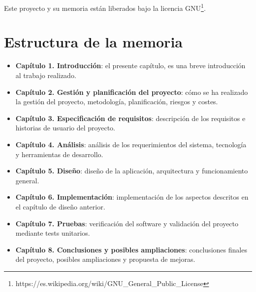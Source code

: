 Este proyecto y su memoria están liberados bajo la licencia GNU\footnote{https://es.wikipedia.org/wiki/GNU\_General\_Public\_License}.

\section{Estructura de la memoria}

\begin{itemize}
    \item \textbf{Capítulo 1. Introducción}: el presente capítulo, es una breve introducción al trabajo realizado. 
    \item \textbf{Capítulo 2. Gestión y planificación del proyecto}: cómo se ha realizado la gestión del proyecto, metodología, planificación, riesgos y costes.
    \item \textbf{Capítulo 3. Especificación de requisitos}: descripción de los requisitos e historias de usuario del proyecto.
    \item \textbf{Capítulo 4. Análisis}: análisis de los requerimientos del sistema, tecnología y herramientas de desarrollo.
    \item \textbf{Capítulo 5. Diseño}: diseño de la aplicación, arquitectura y funcionamiento general.
    \item \textbf{Capítulo 6. Implementación}: implementación de los aspectos descritos en el capítulo de diseño anterior.
    \item \textbf{Capítulo 7. Pruebas}: verificación del software y validación del proyecto mediante tests unitarios.
    \item \textbf{Capítulo 8. Conclusiones y posibles ampliaciones}: conclusiones finales del proyecto, posibles ampliaciones y propuesta de mejoras.
\end{itemize}